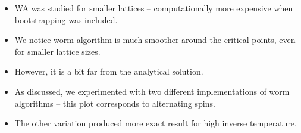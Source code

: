 \documentclass{beamer}
\begin{document}
\begin{frame}
\begin{itemize}
    \item WA was studied for smaller lattices – computationally more expensive when bootstrapping was included.
    \item We notice worm algorithm is much smoother around the critical points, even for smaller lattice sizes.
    \item However, it is a bit far from the analytical solution.
    \item As discussed, we experimented with two different implementations of worm algorithms – this plot corresponds to alternating spins.
    \item The other variation produced more exact result for high inverse temperature.
\end{itemize}
\end{frame}
\end{document}
